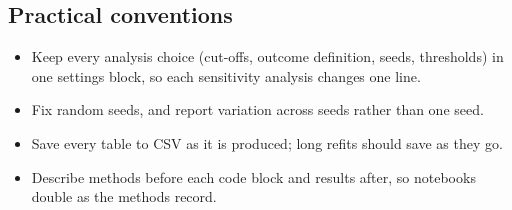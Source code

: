 \subsection{Practical conventions}

\begin{itemize}
\item Keep every analysis choice (cut-offs, outcome definition, seeds, thresholds) in one settings block, so each sensitivity analysis changes one line.
\item Fix random seeds, and report variation across seeds rather than one seed.
\item Save every table to CSV as it is produced; long refits should save as they go.
\item Describe methods before each code block and results after, so notebooks double as the methods record.
\end{itemize}
